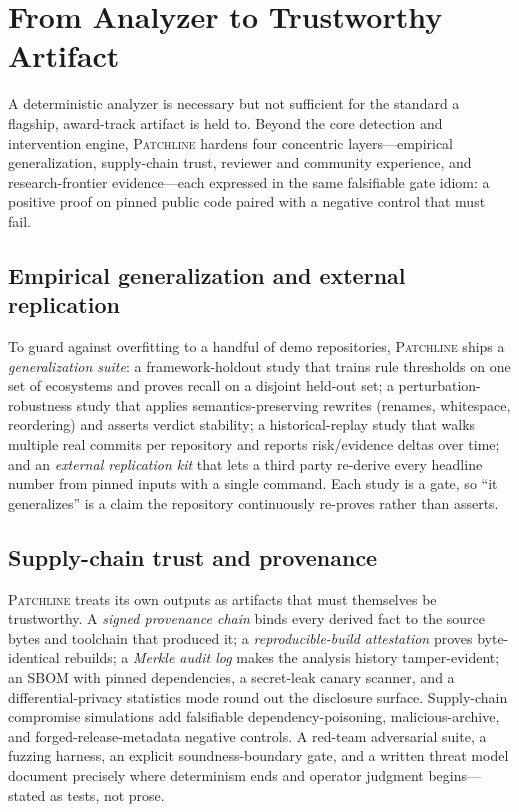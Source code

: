 \documentclass[11pt]{article}
\newcommand{\tool}{\textsc{Patchline}}
\begin{document}
\section{From Analyzer to Trustworthy Artifact}
\label{sec:trust}

A deterministic analyzer is necessary but not sufficient for the standard a flagship,
award-track artifact is held to. Beyond the core detection and intervention engine, \tool{}
hardens four concentric layers---empirical generalization, supply-chain trust, reviewer and
community experience, and research-frontier evidence---each expressed in the same falsifiable
gate idiom: a positive proof on pinned public code paired with a negative control that must fail.

\subsection{Empirical generalization and external replication}
To guard against overfitting to a handful of demo repositories, \tool{} ships a
\emph{generalization suite}: a framework-holdout study that trains rule thresholds on one set of
ecosystems and proves recall on a disjoint held-out set; a perturbation-robustness study that
applies semantics-preserving rewrites (renames, whitespace, reordering) and asserts verdict
stability; a historical-replay study that walks multiple real commits per repository and reports
risk/evidence deltas over time; and an \emph{external replication kit} that lets a third party
re-derive every headline number from pinned inputs with a single command. Each study is a gate, so
``it generalizes'' is a claim the repository continuously re-proves rather than asserts.

\subsection{Supply-chain trust and provenance}
\tool{} treats its own outputs as artifacts that must themselves be trustworthy. A
\emph{signed provenance chain} binds every derived fact to the source bytes and toolchain that
produced it; a \emph{reproducible-build attestation} proves byte-identical rebuilds; a
\emph{Merkle audit log} makes the analysis history tamper-evident; an SBOM with pinned
dependencies, a secret-leak canary scanner, and a differential-privacy statistics mode round out
the disclosure surface. Supply-chain compromise simulations add falsifiable dependency-poisoning,
malicious-archive, and forged-release-metadata negative controls. A red-team adversarial suite, a fuzzing harness, an explicit
soundness-boundary gate, and a written threat model document precisely where determinism ends and
operator judgment begins---stated as tests, not prose.
\end{document}

